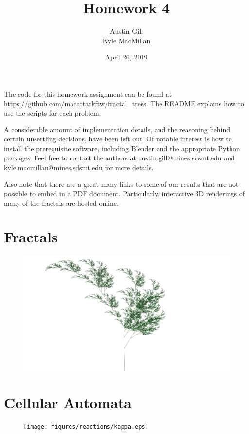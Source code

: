 \documentclass[12pt]{article}
\title{Homework 4}
\author{Austin Gill \\ Kyle MacMillan}
\date{April 26, 2019}
\begin{document}
\maketitle
\begingroup
\hypersetup{linkcolor=black}
\tableofcontents
\endgroup

The code for this homework assignment can be found at \url{https://github.com/macattackftw/fractal_trees}.
The README explains how to use the scripts for each problem.

A considerable amount of implementation details, and the reasoning behind certain unsettling decisions, have been left out.
Of notable interest is how to install the prerequisite software, including Blender and the appropriate Python packages.
Feel free to contact the authors at \href{mailto:austin.gill@mines.sdsmt.edu}{austin.gill@mines.sdsmt.edu} and \href{mailto:kyle.macmillan@mines.sdsmt.edu}{kyle.macmillan@mines.sdsmt.edu} for more details.

Also note that there are a great many links to some of our results that are not possible to embed in a PDF document.
Particularly, interactive 3D renderings of many of the fractals are hosted online.

\newpage

\part{Fractals}
\vspace{2in}
\begin{figure}[H]
    \centering
    \includegraphics[width=\textwidth]{figures/L-systems/a.png}
\end{figure}




\part{Cellular Automata}
\begin{figure}[H]
    \centering
    \texttt{[image: figures/reactions/kappa.eps]}
\end{figure}


\end{document}
